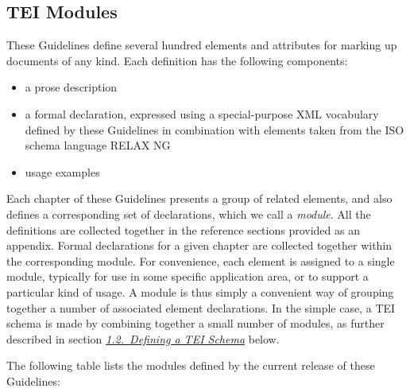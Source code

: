 \subsection[{TEI Modules}]{TEI Modules}\label{STMA}\par
These Guidelines define several hundred elements and attributes for marking up documents of any kind. Each definition has the following components: \begin{itemize}
\item a prose description
\item a formal declaration, expressed using a special-purpose XML vocabulary defined by these Guidelines in combination with elements taken from the ISO schema language RELAX NG
\item usage examples
\end{itemize} \par
Each chapter of these Guidelines presents a group of related elements, and also defines a corresponding set of declarations, which we call a \textit{module}. All the definitions are collected together in the reference sections provided as an appendix. Formal declarations for a given chapter are collected together within the corresponding module. For convenience, each element is assigned to a single module, typically for use in some specific application area, or to support a particular kind of usage. A module is thus simply a convenient way of grouping together a number of associated element declarations. In the simple case, a TEI schema is made by combining together a small number of modules, as further described in section \textit{\hyperref[STIN]{1.2.\ Defining a TEI Schema}} below.\par
The following table lists the modules defined by the current release of these Guidelines:  \label{tab-mods} \par 
